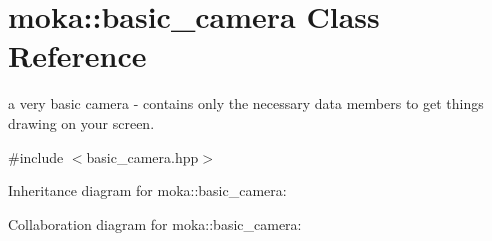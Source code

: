 \hypertarget{classmoka_1_1basic__camera}{}\section{moka\+::basic\+\_\+camera Class Reference}
\label{classmoka_1_1basic__camera}


a very basic camera -\/ contains only the necessary data members to get things drawing on your screen.  




{\ttfamily \#include $<$basic\+\_\+camera.\+hpp$>$}



Inheritance diagram for moka\+::basic\+\_\+camera\+:


Collaboration diagram for moka\+::basic\+\_\+camera\+:
